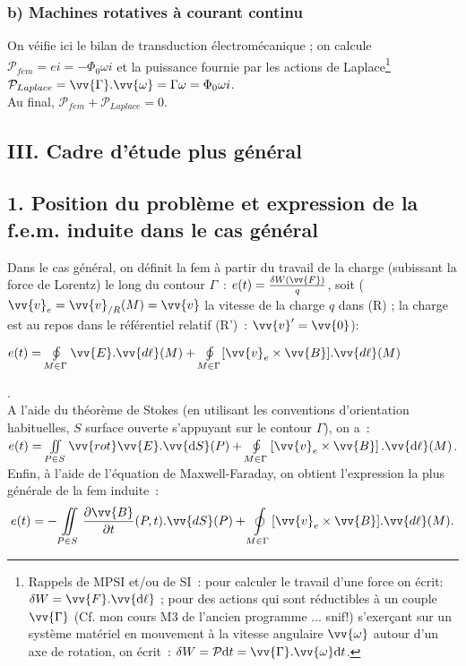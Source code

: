 \documentclass{article}
\newcommand{\mathcolorbox}[2]{\colorbox{#1}{$#2$}}
\let\oldiint\iint
\renewcommand{\iint}{\oldiint\limits}
\let\oldoint\oint
\renewcommand{\oint}{\oldoint\limits}
\renewcommand\overrightarrow{\vv}
\begin{document}
\subsubsection*{b) Machines rotatives à courant continu}
On véifie ici le bilan de transduction électromécanique ; on calcule
$\mathcal{P}_{fem} = e i = -\Phi_{0}\omega i$ et la puissance
fournie par les actions de Laplace\footnote{Rappels de MPSI et/ou de
SI : pour calculer le travail d'une force on écrit: $\delta W
=\overrightarrow{F}.\overrightarrow{\mathrm{d}\ell}$ ; pour des actions qui
sont réductibles à un couple $\overrightarrow{\Gamma}$ (Cf. mon
cours M3 de l'ancien programme ... snif!) s'exerçant sur un système
matériel en mouvement à la vitesse angulaire
$\overrightarrow{\omega}$ autour d'un axe de rotation, on écrit :
$\delta W = \mathcal{P}\mathrm{d}t =
\overrightarrow{\Gamma}.\overrightarrow{\omega}\mathrm{d}t$.}
$\mathcal{P}_{Laplace} =
\overrightarrow{\Gamma}.\overrightarrow{\omega} = \Gamma \omega =
\Phi_{0}\omega i$. \\
Au final, $\mathcal{P}_{fem}+\mathcal{P}_{Laplace}=0$.

\subsection*{III. Cadre d'étude plus général}
\subsection*{1. Position du problème et expression de la f.e.m. induite
dans le cas général}
Dans le cas général, on définit la fem à partir du travail de la
charge (subissant la force de Lorentz) le long du contour $\Gamma$ :
$e(t) = \frac{\delta W(\overrightarrow{F})}{q}$, soit
($\overrightarrow{v}_{e} =
\overrightarrow{v}_{/R}(M)=\overrightarrow{v}$ la vitesse de la
charge $q$ dans (R) ; la charge est au repos dans le référentiel
relatif (R') : $\overrightarrow{v}'=\overrightarrow{0}$):
\\
\centerline{\mathcolorbox{gray!20}{e(t) = \oint_{M\in
\Gamma}\overrightarrow{E}.\overrightarrow{d\ell}(M)+\oint_{M\in
\Gamma}[\overrightarrow{v}_{e}\times
\overrightarrow{B}].\overrightarrow{d\ell}(M)}}. \\
A l'aide du théorème de Stokes (en utilisant les conventions
d'orientation habituelles, $S$ surface ouverte s'appuyant sur le
contour $\Gamma$), on a : $e(t) = \iint_{P\in
S}\overrightarrow{rot}\overrightarrow{E}.\overrightarrow{\mathrm{d}S}(P)+\oint_{M\in
\Gamma}\left[\overrightarrow{v}_{e}\times
\overrightarrow{B}\right].\overrightarrow{\mathrm{d}\ell}(M)$. \\
Enfin, à l'aide de l'équation de Maxwell-Faraday, on obtient
l'expression la plus générale de la fem induite :
\begin{eqnarray}\label{Eq.60}
e(t) = -\iint_{P\in S}\frac{\partial\overrightarrow{B}}{\partial
t}(P,t).\overrightarrow{dS}(P) +\oint_{M\in
\Gamma}[\overrightarrow{v}_{e}\times
\overrightarrow{B}].\overrightarrow{d\ell}(M).
\end{eqnarray}
\end{document}
